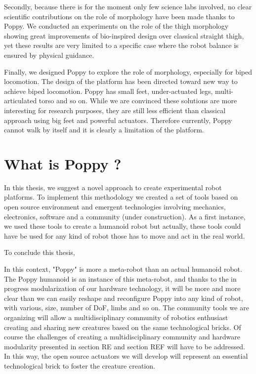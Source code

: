 Secondly, because there is for the moment only few science labs involved, no clear scientific contributions on the role of morphology have been made thanks to Poppy. We conducted an experiments on the role of the thigh morphology showing great improvements of bio-inspired design over classical straight thigh, yet these results are very limited to a specific case where the robot balance is ensured by physical guidance.

Finally, we designed Poppy to explore the role of morphology, especially for biped locomotion. The design of the platform has been directed toward new way to achieve biped locomotion. Poppy has small feet, under-actuated legs, multi-articulated torso and so on. While we are convinced these solutions are more interesting for research purposes, they are still less efficient than classical approach using big feet and powerful actuators.
Therefore currently, Poppy cannot walk by itself and it is clearly a limitation of the platform.



\section{What is Poppy ?} %
\label{sec:what_is_poppy}


In this thesis, we suggest a novel approach to create experimental robot platforms. To implement this methodology we created a set of tools based on open source environment and emergent technologies involving mechanics, electronics, software and a community (under construction). As a first instance, we used these tools to create a humanoid robot but actually, these tools could have be used for any kind of robot those has to move and act in the real world.

To conclude this thesis,

In this context, "Poppy" is more a meta-robot than an actual humanoid robot. The Poppy humanoid is an instance of this meta-robot, and thanks to the in progress modularization of our hardware technology, it will be more and more clear than we can easily reshape and reconfigure Poppy into any kind of robot, with various, size, number of DoF, limbs and so on. The community tools we are organizing will allow a multidisciplinary community of robotics enthusiast creating and sharing new creatures based on the same technological bricks. Of course the challenges of creating a multidisciplinary community and hardware modularity presented in section RE and section REF will have to be addressed. In this way, the open source actuators we will develop will represent an essential technological brick to foster the creature creation.

